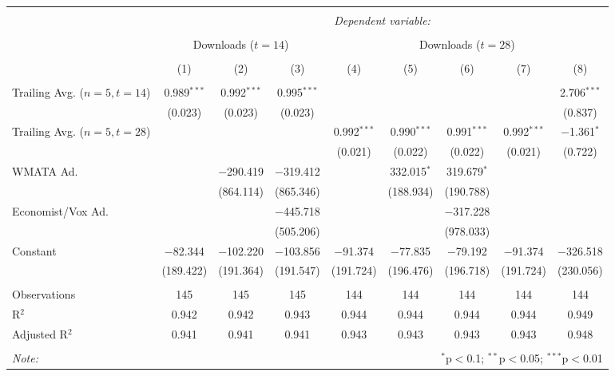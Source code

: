 \documentclass[11pt, letterpaper, twoside]{article}
\begin{document}
\begin{landscape}
    \thispagestyle{empty}
    \begin{table}[!htbp] \centering
        \caption{}
        \label{}
      \begin{tabular}{@{\extracolsep{5pt}}lcccccccc} 
      \\[-1.8ex]\hline
      \hline \\[-1.8ex]
       & \multicolumn{8}{c}{\textit{Dependent variable:}} \\
      \cline{2-9} 
      \\[-1.8ex] & \multicolumn{3}{c}{Downloads ($t=14$)} & \multicolumn{5}{c}{Downloads ($t=28$)} \\       
      \\[-1.8ex] & (1) & (2) & (3) & (4) & (5) & (6) & (7) & (8)\\ 
      \hline \\[-1.8ex]
       Trailing Avg. ($n=5, t=14$) & 0.989$^{***}$ & 0.992$^{***}$ & 0.995$^{***}$ &  &  &  &  & 2.706$^{***}$ \\
        & (0.023) & (0.023) & (0.023) &  &  &  &  & (0.837) \\
        Trailing Avg. ($n=5, t=28$) &  &  &  & 0.992$^{***}$ & 0.990$^{***}$ & 0.991$^{***}$ & 0.992$^{***}$ & $-$1.361$^{*}$ \\
        &  &  &  & (0.021) & (0.022) & (0.022) & (0.021) & (0.722) \\ 
        WMATA Ad. &  & $-$290.419 & $-$319.412 &  & 332.015$^{*}$ & 319.679$^{*}$ &  &  \\
        &  & (864.114) & (865.346) &  & (188.934) & (190.788) &  &  \\
        Economist/Vox Ad. &  &  & $-$445.718 &  &  & $-$317.228 &  &  \\ 
        &  &  & (505.206) &  &  & (978.033) &  &  \\
        Constant & $-$82.344 & $-$102.220 & $-$103.856 & $-$91.374 & $-$77.835 & $-$79.192 & $-$91.374 & $-$326.518 \\
        & (189.422) & (191.364) & (191.547) & (191.724) & (196.476) & (196.718) & (191.724) & (230.056) \\  
       \hline \\[-1.8ex]
      Observations & 145 & 145 & 145 & 144 & 144 & 144 & 144 & 144 \\ 
      R$^{2}$ & 0.942 & 0.942 & 0.943 & 0.944 & 0.944 & 0.944 & 0.944 & 0.949 \\
      Adjusted R$^{2}$ & 0.941 & 0.941 & 0.941 & 0.943 & 0.943 & 0.943 & 0.943 & 0.948 \\ 
      \hline
      \hline \\[-1.8ex]
      \textit{Note:}  & \multicolumn{8}{r}{$^{*}$p$<$0.1; $^{**}$p$<$0.05; $^{***}$p$<$0.01} \\
      \end{tabular}
      \end{table}
\end{landscape}    
\end{document}
